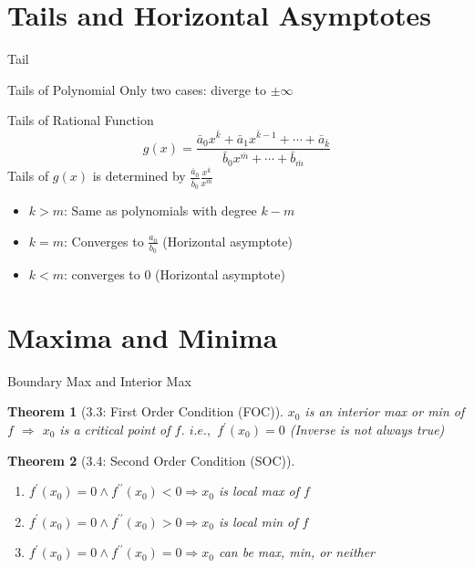 \documentclass[final]{beamer}
\newtheorem{thm}{Theorem}
\begin{document}
\section{Tails and Horizontal Asymptotes} %
\label{sec:tails_and_horizontal_asymptotes}
\begin{frame}[t]{Tail}
	\begin{block}
		{Tails of Polynomial}
		Only two cases: diverge to $\pm\infty$
	\end{block}
	\begin{block}
		{Tails of Rational Function}
		\[
			g(x) = \frac{\bar a_0 x^{\bar k} + \bar a_1 x^{\bar k-1} + \cdots + \bar a_{\bar k}}{\bar b_0 x^{\bar m} + \cdots +\bar b_{\bar m}}
		\]
		Tails of $g(x)$ is determined by $\frac{\bar a_0}{\bar b_0}\frac{x^{\bar k}}{x^{\bar m}}$
		\begin{itemize}
			\item $k>m$: Same as polynomials with degree $k-m$
			\item $k=m$: Converges to $\frac{a_0}{b_0}$ (Horizontal asymptote)
			\item $k<m$: converges to $0$ (Horizontal asymptote)
		\end{itemize}
	\end{block}
\end{frame}

\section{Maxima and Minima} %
\label{sec:maxima_and_minima}
\begin{frame}[t]{Boundary Max and Interior Max}
	\begin{thm}
		[3.3: First Order Condition (FOC)]
		$x_0$ is an interior max or min of $f$ $\Rightarrow$ $x_0$ is a critical point of $f$. $i.e.,$ $f^\prime(x_0)=0$
		(Inverse is not always true)
	\end{thm}
	
	\begin{thm}
		[3.4: Second Order Condition (SOC)]
		\begin{enumerate}
			\item $f^\prime(x_0)=0 \land f^{\prime\prime}(x_0)<0 \Rightarrow x_0$ is local max of $f$
			\item $f^\prime(x_0)=0 \land f^{\prime\prime}(x_0)>0 \Rightarrow x_0$ is local min of $f$
			\item $f^\prime(x_0)=0 \land f^{\prime\prime}(x_0)=0 \Rightarrow x_0$ can be max, min, or neither
		\end{enumerate}
	\end{thm}
\end{frame}
\end{document}
